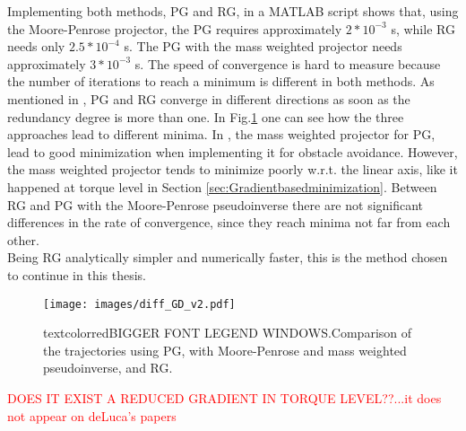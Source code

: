 Implementing both methods, PG and RG, in a MATLAB script shows that, using the Moore-Penrose projector, the PG  requires approximately $2*10^{-3}$ s, while RG  needs only $2.5*10^{-4}$ s. The PG with the mass weighted projector needs approximately $3*10^{-3}$ s. The speed of convergence is hard to measure because the number of iterations to reach a minimum is different in both methods.
As mentioned in \cite{reduced_gradient}, PG and RG converge in different directions as soon as the redundancy degree is more than one. In Fig.\ref{fig:diff_GD_v2} one can see how the three approaches lead to different minima.  In \cite{Nemec_2}, the mass weighted projector for PG, lead to good minimization when implementing it for obstacle avoidance. 
However, the mass weighted projector tends to minimize poorly w.r.t. the linear axis, like it happened at torque level in Section \ref{sec:Gradientbasedminimization}.  Between RG and PG with the Moore-Penrose pseudoinverse there are not significant differences in the rate of convergence, since they reach minima not far from each other.  \\ 
Being RG analytically simpler and numerically faster, this is the method chosen to continue in this thesis. 


\begin{figure}[!htb]
	\centerline{
		\texttt{[image: images/diff\_GD\_v2.pdf]}}
	\caption{textcolor{red}{BIGGER FONT LEGEND WINDOWS.}Comparison of the trajectories using PG, with Moore-Penrose and mass weighted pseudoinverse, and RG.}
	\label{fig:diff_GD_v2}
\end{figure}




\textcolor{red}{DOES IT EXIST A REDUCED GRADIENT IN TORQUE LEVEL??...it does not appear on deLuca's papers}






%




